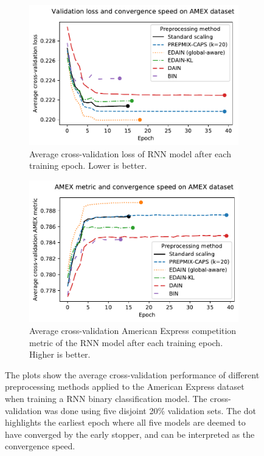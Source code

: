 \documentclass{statsmsc}
\begin{document}
{%
\begin{figure}[htp]
\centering
\begin{subfigure}[b]{0.99\textwidth}
    \centering
    \includegraphics[width=\textwidth]{figures/amex_performance_convergence.pdf}
    \caption{Average cross-validation loss of \ac{RNN} model after each training epoch.
    Lower is better.}
    \label{fig:amex_performance_loss}
\end{subfigure}
\hfill
\begin{subfigure}[b]{0.99\textwidth}
    \centering
    \includegraphics[width=\textwidth]{figures/amex_performance_convergence_metric.pdf}
    \caption{Average cross-validation American Express competition metric of the \ac{RNN} model
    after each training epoch. Higher is better.}
    \label{fig:amex_performance_metric}
\end{subfigure}
\caption{
    The plots show the average cross-validation performance of different preprocessing methods
    applied to the American Express dataset when training a \ac{RNN} binary classification model.
    The cross-validation was done using five disjoint 20\% validation sets.
    The dot highlights the earliest epoch where all five models are deemed to have converged by
    the early stopper, and can be interpreted as the convergence speed.
}%
\label{fig:amex_performance}
\end{figure}

}
\end{document}
